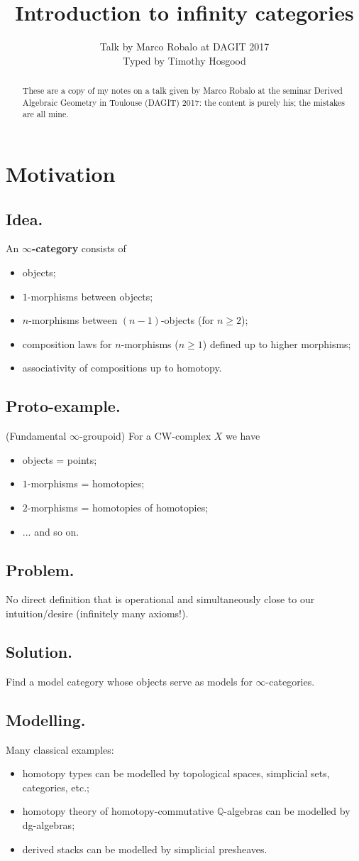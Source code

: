 \documentclass{article}
\title{Introduction to infinity categories}
\author{Talk by Marco Robalo at DAGIT 2017\\Typed by Timothy Hosgood}
\date{\displaydate{date}}
\numberwithin{equation}{subsection}
\renewcommand{\ss}[1]{\subsection{#1}}
\begin{document}
    \maketitle

    \begin{abstract}
        These are a copy of my notes on a talk given by Marco Robalo at the seminar Derived Algebraic Geometry in Toulouse (DAGIT) 2017: the content is purely his; the mistakes are all mine.
    \end{abstract}

    \section{Motivation}

        \ss{Idea.}
            An \textbf{$\infty$-category} consists of
            \begin{itemize}
                \item objects;
                \item $1$-morphisms between objects;
                \item $n$-morphisms between $(n-1)$-objects (for $n\geqslant2$);
                \item composition laws for $n$-morphisms ($n\geqslant1$) defined up to higher morphisms;
                \item associativity of compositions up to homotopy.
            \end{itemize}

        \ss{Proto-example.} (Fundamental $\infty$-groupoid)
            For a CW-complex $X$ we have
            \begin{itemize}
                \item objects = points;
                \item $1$-morphisms = homotopies;
                \item $2$-morphisms = homotopies of homotopies;
                \item ... and so on.
            \end{itemize}

        \ss{Problem.}
            No direct definition that is operational and simultaneously close to our intuition/desire (infinitely many axioms!).

        \ss{Solution.}
            Find a model category whose objects serve as models for $\infty$-categories.

        \ss{Modelling.}
            Many classical examples:
            \begin{itemize}
                \item homotopy types can be modelled by topological spaces, simplicial sets, categories, etc.;
                \item homotopy theory of homotopy-commutative $\mathbb{Q}$-algebras can be modelled by dg-algebras;
                \item derived stacks can be modelled by simplicial presheaves.
            \end{itemize}
\end{document}

